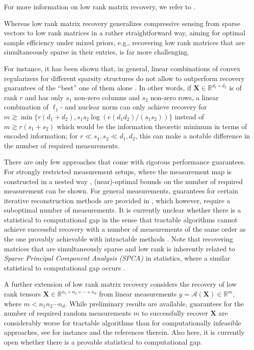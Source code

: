 \documentclass{svproc}
\newcommand{\bX}{\boldsymbol{X}}
\newcommand{\0}{\boldsymbol{0}}
\newcommand{\1}{\boldsymbol{1}}
\def\R{\mathbb{R}}
\begin{document}
For more information on low rank matrix recovery, we refer to \cite{davenport2016overview,candes2009exact,gross2011recovering,KuengRauhutTerstiege2017,recht2010guaranteed}.

\begin{remark}
    Whereas low rank matrix recovery generalizes compressive sensing from sparse vectors to low rank matrices in a rather straightforward way, aiming for optimal sample efficiency under mixed priors, e.g., recovering low rank matrices that are simultaneously sparse in their entries, is far more challenging. 
    
    For instance, it has been shown that, in general, linear combinations of convex regularizers for different sparsity structures do not allow to
    outperform recovery guarantees of the “best” one of them alone \cite{oymak2015simultaneously}. In other words, if $\mathbf X \in \R^{d_1\times d_2}$ is of rank $r$ and has only $s_1$ non-zero columns and $s_2$ non-zero rows, a linear combination of $\ell_1$- and nuclear norm can only achieve recovery for $m \gtrsim \min\{ r (d_1+d_2), s_1s_2 \log(e(d_1d_2)/(s_1s_2)) \}$ instead of $m \gtrsim r (s_1+s_2)$ which would be the information theoretic minimum in terms of encoded information; for $r \ll s_1,s_2 \ll d_1,d_2$, this can make a notable difference in the number of required measurements.

    There are only few approaches that come with rigorous performance guarantees. %
    For strongly restricted measurement setups, where the measurement map is constructed in a nested way \cite{bahmani2016near,foucart2020jointly}, (near)-optimal bounds on the number of required measurement can be shown.
     For general measurements, guarantees for %
     certain iterative reconstruction methods are provided in \cite{lee2017near,fornasier2021robust,foucart2020jointly,maly2023robust}, which however, require a suboptimal number of measurements. It is currently unclear whether there is a statistical to computational gap in the sense that tractable algorithms cannot achieve successful recovery with a number of measurements of the same order as the one provably achievable with intractable methods \cite{foucart2020jointly}. Note that recovering matrices that are simultaneously sparse and low rank is inherently related to \emph{Sparse Principal Component Analysis (SPCA)} \cite{zou2006sparse,d2004direct} in statistics, where a similar statistical to computational gap occurs \cite{berthet2013,brennan18a}.

     A further extension of low rank matrix recovery considers the recovery of low rank tensors $\bX \in \R^{n_1\times n_2 \times \cdots \times n_d}$ from linear measurements $y = \mathcal{A}(\bX) \in \R^m$, where $m < n_1n_2 \cdots n_d$. While preliminary results are available, guarantees for the number of required random measurements $m$ to successfully recover $\bX$ are considerably worse for tractable algorithms than for computationally infeasible approaches, see for instance \cite{barak2016noisy,ghadermarzy2019near,mu2014square,rauhut2017low,rauhut2021tensor} and the references therein. Also here, it is currently open whether there is a provable statistical to computational gap.
\end{remark}
\end{document}
